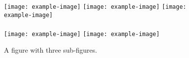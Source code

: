 \begin{figure}[th]
    \centering
    \texttt{[image: example-image]}
    \texttt{[image: example-image]}
    \texttt{[image: example-image]}
    \\
    \\ \vspace{0.5em}
    \texttt{[image: example-image]}
    \texttt{[image: example-image]}
     \\
    \caption{A figure with three sub-figures.}
    \label{fig:fig15}
\end{figure}
